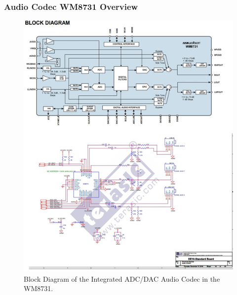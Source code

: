 \subsubsection{Audio Codec WM8731 Overview}

\begin{figure}[H]
	\centering
	\includegraphics[width=0.7\linewidth]{./my-chapters/my-images/theoretical_background/WM8731_blockdiagram.png}
	\caption{Block Diagram of the Integrated ADC/DAC Audio Codec in the WM8731.}
\end{figure}

